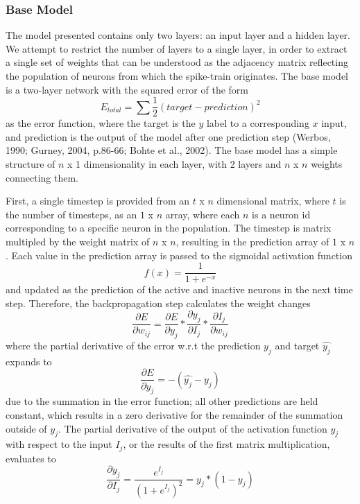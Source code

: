 \documentclass[11pt]{article}
\begin{document}
\subsubsection{Base Model}
The model presented contains only two layers: an input layer and a hidden layer. We attempt to restrict the number of layers to a single layer, in order to extract a single set of weights that can be understood as the adjacency matrix reflecting the population of neurons from which the spike-train originates. The base model is a two-layer network with the squared error of the form $$E_{total} = \sum{\frac{1}{2}(target-prediction)^2}$$ as the error function, where the target is the $y$ label to a corresponding $x$ input, and prediction is the output of the model after one prediction step (Werbos, 1990; Gurney, 2004, p.86-66; Bohte et al., 2002). The base model has a simple structure of $n$ x 1 dimensionality in each layer, with 2 layers and $n$ x $n$ weights connecting them.\par
First, a single timestep is provided from an $t$ x $n$ dimensional matrix, where $t$ is the number of timesteps, as an $1$ x $n$ array, where each $n$ is a neuron id corresponding to a specific neuron in the population. The timestep is matrix multipled by the weight matrix of $n$ x $n$, resulting in the prediction array of $1$ x $n$. Each value in the prediction array is passed to the sigmoidal activation function $$ f(x) = \frac{1}{1 + e^{-x}}$$ and updated as the prediction of the active and inactive neurons in the next time step. Therefore, the backpropagation step calculates the weight changes $$\frac{\partial E}{\partial w_{ij}} = \frac{\partial E}{\partial y_j} * \frac{\partial y_j}{\partial I_{j}} * \frac{\partial I_{j}}{\partial w_{ij}}$$ where the partial derivative of the error w.r.t the prediction $y_j$ and target $\hat{y_j}$ expands to $$\frac{\partial E}{\partial y_j} = -(\hat{y_j} - y_j) $$ due to the summation in the error function; all other predictions are held constant, which results in a zero derivative for the remainder of the summation outside of $y_j$. The partial derivative of the output of the activation function $y_j$ with respect to the input $I_j$, or the results of the first matrix multiplication, evaluates to $$\frac{\partial y_j}{\partial I_j} = \frac{e^{I_j}}{(1+e^{I_j})^2} = y_j * (1 - y_j)$$
\end{document}
